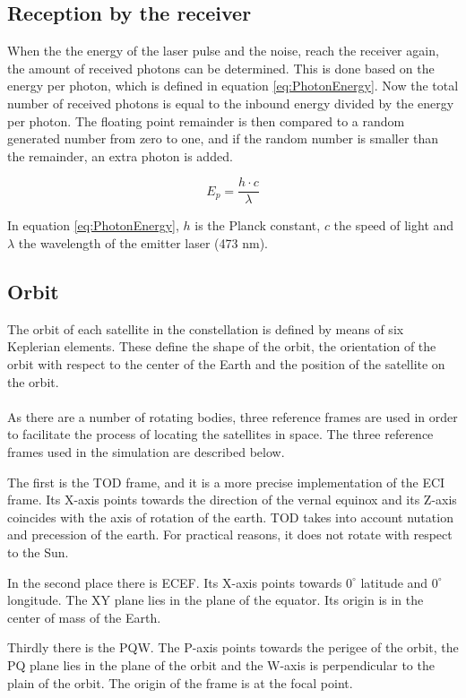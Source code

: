 \subsection{Reception by the receiver}
When the the energy of the laser pulse and the noise, reach the receiver again, the amount of received photons can be determined. This is done based on the energy per photon, which is defined in equation \ref{eq:PhotonEnergy}. Now the total number of received photons is equal to the inbound energy divided by the energy per photon. The floating point remainder is then compared to a random generated number from zero to one, and if the random number is smaller than the remainder, an extra photon is added.

\begin{equation}
	E_{p}=\frac{h \cdot c}{\lambda}
	\label{eq:PhotonEnergy}
\end{equation}

In equation \ref{eq:PhotonEnergy}, $h$ is the Planck constant, $c$ the speed of light and $\lambda$ the wavelength of the emitter laser (473 nm).

\subsection{Orbit}
\label{orbit}
The orbit of each satellite in the constellation is defined by means of six Keplerian elements. These define the shape of the orbit, the orientation of the orbit with respect to the center of the Earth and the position of the satellite on the orbit.\\\\
As there are a number of rotating bodies, three reference frames are used in order to facilitate the process of locating the satellites in space. The three reference frames used in the simulation are described below.

The first is the \ac{TOD} frame, and it is a more precise implementation of the \acs{ECI} frame. Its X-axis points towards the direction of the vernal equinox and its Z-axis coincides with the axis of rotation of the earth. \ac{TOD} takes into account nutation and precession of the earth. For practical reasons, it does not rotate with respect to the Sun.
 
In the second place there is \ac{ECEF}. Its X-axis points towards $0^\circ$ latitude and $0^\circ$ longitude. The XY plane lies in the plane of the equator. Its origin is in the center of mass of the Earth. 

Thirdly there is the PQW. The P-axis points towards the perigee of the orbit, the PQ plane lies in the plane of the orbit and the W-axis is perpendicular to the plain of the orbit. The origin of the frame is at the focal point. 

